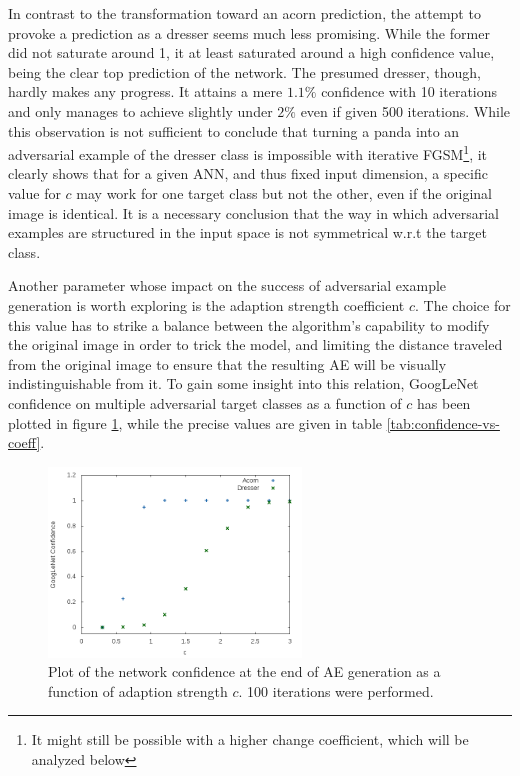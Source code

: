 \documentclass[11pt, a4paper]{article}
\begin{document}
In contrast to the transformation toward an acorn prediction, the attempt to provoke a prediction as a dresser seems much less promising. While the former did not saturate around 1, it at least saturated around a high confidence value, being the clear top prediction of the network. The presumed dresser, though, hardly makes any progress. It attains a mere $1.1\%$ confidence with 10 iterations and only manages to achieve slightly under $2\%$ even if given 500 iterations. While this observation is not sufficient to conclude that turning a panda into an adversarial example of the dresser class is impossible with iterative FGSM\footnote{It might still be possible with a higher change coefficient, which will be analyzed below}, it clearly shows that for a given ANN, and thus fixed input dimension, a specific value for $c$ may work for one target class but not the other, even if the original image is identical. It is a necessary conclusion that the way in which adversarial examples are structured in the input space is not symmetrical w.r.t the target class.

Another parameter whose impact on the success of adversarial example generation is worth exploring is the adaption strength coefficient $c$. The choice for this value has to strike a balance between the algorithm's capability to modify the original image in order to trick the model, and limiting the distance traveled from the original image to ensure that the resulting AE will be visually indistinguishable from it. To gain some insight into this relation, GoogLeNet confidence on multiple adversarial target classes as a function of $c$ has been plotted in figure \ref{fig:confidence-vs-coeff}, while the precise values are given in table \ref{tab:confidence-vs-coeff}.

\begin{figure}[htb]
	\centering
	\includegraphics[width=0.6\textwidth]{images/confidence-vs-coeff.png}
	\caption{Plot of the network confidence at the end of AE generation as a function of adaption strength $c$. 100 iterations were performed.}
	\label{fig:confidence-vs-coeff}
\end{figure}
\end{document}
